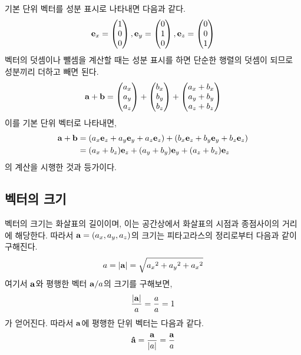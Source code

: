 기본 단위 벡터를 성분 표시로 나타내면 다음과 같다.
\[\vb{e}_x = \begin{pmatrix}
    1 \\
    0 \\
    0
  \end{pmatrix}, \vb{e}_y = \begin{pmatrix}
    0 \\
    1 \\
    0
  \end{pmatrix}, \vb{e}_z = \begin{pmatrix}
    0 \\
    0 \\
    1
  \end{pmatrix}
\]
벡터의 덧셈이나 뺄셈을 계산할 때는 성분 표시를 하면 단순한 행렬의 덧셈이 되므로 성분끼리 더하고 빼면 된다.
\[
  \vb{a}+\vb{b} = \begin{pmatrix}
    a_x \\
    a_y \\
    a_z
  \end{pmatrix} + \begin{pmatrix}
    b_x \\
    b_y \\
    b_z
  \end{pmatrix} + \begin{pmatrix}
    a_x + b_x \\
    a_y + b_y \\
    a_z + b_z
  \end{pmatrix}
\]
이를 기본 단위 벡터로 나타내면,
\begin{align*}
  \vb{a} + \vb{b} & = (a_x\vb{e}_z + a_y\vb{e}_y + a_z\vb{e}_z) + (b_x\vb{e}_z + b_y\vb{e}_y + b_z\vb{e}_z) \\
                  & = (a_x + b_z)\vb{e}_z + (a_y + b_y)\vb{e}_y + (a_z + b_z)\vb{e}_z
\end{align*}
의 계산을 시행한 것과 등가이다.

\subsection{벡터의 크기}

벡터의 크기는 화살표의 길이이며, 이는 공간상에서 화살표의 시점과 종점사이의 거리에 해당한다. 따라서 $\vb{a} = (a_x,a_y,a_z)$의 크기는 피타고라스의 정리로부터 다음과 같이 구해진다.
\[a=\abs{\vb{a}} = \sqrt{{a_x}^2+{a_y}^2+{a_x}^2}\]
여기서 $\vb{a}$와 평행한 벡터 $\vb{a}/a$의 크기를 구해보면,
\[\frac{\abs{\vb{a}}}{a} = \frac{a}{a} = 1\]
가 얻어진다. 따라서 $\vb{a}$에 평행한 단위 벡터는 다음과 같다.
\[\vu{a} = \frac{\vb{a}}{\abs{a}} = \frac{\vb{a}}{a}\]

